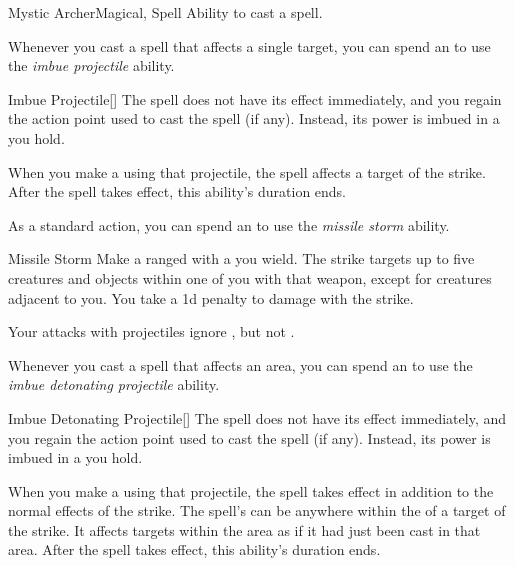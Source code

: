     \begin{feat}{Mystic Archer}{Magical, Spell}
        \featpre Ability to cast a spell.

         Whenever you cast a spell that affects a single target, you can spend an  to use the \textit{imbue projectile} ability.
        \begin{ability}{Imbue Projectile}[]
            The spell does not have its effect immediately, and you regain the action point used to cast the spell (if any).
            Instead, its power is imbued in a  you hold. 

            When you make a  using that projectile, the spell affects a target of the strike.
            After the spell takes effect, this ability's duration ends.
        \end{ability}

         As a standard action, you can spend an  to use the \textit{missile storm} ability.
        \begin{ability}{Missile Storm}
            Make a ranged  with a  you wield.
            The strike targets up to five creatures and objects within one  of you with that weapon, except for creatures adjacent to you.
            You take a \minus1d penalty to damage with the strike.
        \end{ability}

         Your attacks with projectiles ignore , but not .

         Whenever you cast a spell that affects an area, you can spend an  to use the \textit{imbue detonating projectile} ability.
        \begin{ability}{Imbue Detonating Projectile}[]
            The spell does not have its effect immediately, and you regain the action point used to cast the spell (if any).
            Instead, its power is imbued in a  you hold. 

            When you make a  using that projectile, the spell takes effect in addition to the normal effects of the strike.
            The spell's  can be anywhere within the  of a target of the strike.
            It affects targets within the area as if it had just been cast in that area.
            After the spell takes effect, this ability's duration ends.
        \end{ability}


\end{feat}

